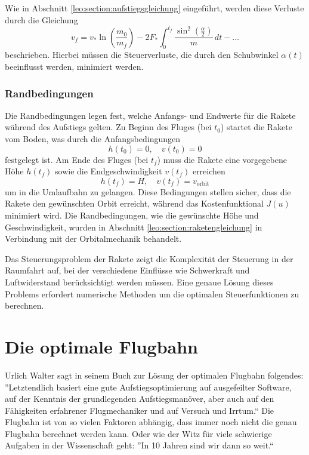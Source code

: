Wie in Abschnitt \ref{leo:section:aufstiegsgleichung} eingeführt, werden diese Verluste durch die Gleichung
\[
v_f = v_* \ln \left(\frac{m_0}{m_f}\right) - 2F_* \int_0^{t_f} \frac{\sin^2\left(\frac{\alpha}{2}\right)}{m} \, dt - \dots
\]
beschrieben. Hierbei müssen die Steuerverluste, die durch den Schubwinkel \( \alpha(t) \) beeinflusst werden, minimiert werden.

\subsubsection{Randbedingungen}
Die Randbedingungen legen fest, welche Anfangs- und Endwerte für die Rakete während des Aufstiegs gelten. Zu Beginn des Fluges (bei \( t_0 \)) startet die Rakete vom Boden, was durch die Anfangsbedingungen
\[
h(t_0) = 0, \quad v(t_0) = 0
\]
festgelegt ist. 
Am Ende des Fluges (bei \( t_f \)) muss die Rakete eine vorgegebene Höhe \( h(t_f) \) sowie die Endgeschwindigkeit \( v(t_f) \) erreichen
\[
h(t_f) = H, \quad v(t_f) = v_{\text{orbit}}
\]
um in die Umlaufbahn zu gelangen.
Diese Bedingungen stellen sicher, dass die Rakete den gewünschten Orbit erreicht, während das Kostenfunktional \( J(u) \) minimiert wird.
Die Randbedingungen, wie die gewünschte Höhe und Geschwindigkeit, wurden in Abschnitt \ref{leo:section:raketengleichung} in Verbindung mit der Orbitalmechanik behandelt.

Das Steuerungsproblem der Rakete zeigt die Komplexität der Steuerung in der Raumfahrt auf, bei der verschiedene Einflüsse wie Schwerkraft und Luftwiderstand berücksichtigt werden müssen. Eine genaue Lösung dieses Problems erfordert numerische Methoden um die optimalen Steuerfunktionen zu berechnen.

\section{Die optimale Flugbahn}

Urlich Walter sagt in seinem Buch \cite[section 6.4.7]{leo:astronautics} zur Lösung der optimalen Flugbahn folgendes: ''Letztendlich basiert eine gute Aufstiegsoptimierung auf ausgefeilter Software, auf der Kenntnis der grundlegenden Aufstiegsmanöver, aber auch auf den Fähigkeiten erfahrener Flugmechaniker und auf Versuch und Irrtum.``
Die Flugbahn ist von so vielen Faktoren abhängig, dass immer noch nicht die genau Flugbahn berechnet werden kann. 
Oder wie der Witz für viele schwierige Aufgaben in der Wissenschaft geht: ''In 10 Jahren sind wir dann so weit.``

